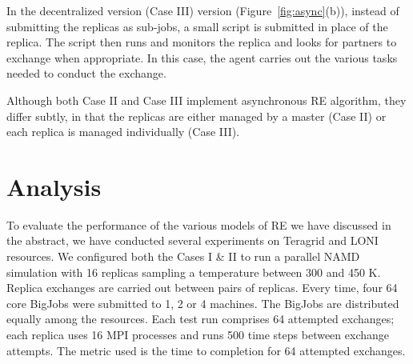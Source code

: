 \documentclass[a4paper,10pt]{article}
\newcommand{\jhanote}[1]{ {\textcolor{red} { ***shantenu: #1 }}}
\newcommand{\jhanote}[1]{}
\begin{document}
 

In the decentralized version (Case III) version
(Figure~\ref{fig:async}(b)), instead of submitting the replicas as sub-jobs, a small script is
submitted in place of the replica. %
The script then runs and monitors the replica and looks for partners to exchange when appropriate. In this case, the agent carries out the various tasks needed to conduct the exchange. %

Although both Case II and Case III implement asynchronous 
RE algorithm, they differ subtly, in that the replicas
are either managed by a master (Case II) or each replica
is managed individually (Case III).

\section{Analysis}

To evaluate the performance of the various models of RE we have discussed in the abstract, we have conducted several experiments on Teragrid and LONI resources. 
We configured both the Cases I \& II to run a parallel NAMD simulation with 16 replicas sampling a temperature between 300 and 450 K. Replica exchanges are carried out between pairs of replicas. Every time, four 64 core BigJobs were submitted to 1, 2 or 4 machines. The BigJobs are distributed equally among the resources. Each test run comprises 64 attempted exchanges; each replica uses 16 MPI processes and runs 500 time steps between exchange attempts.%
The metric used is the time to completion for 64 attempted exchanges. %
\end{document}
